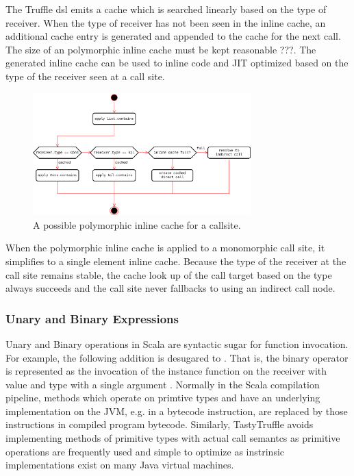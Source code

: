 The Truffle \acrshort{dsl} emits a cache which is searched linearly based on the type of receiver. 
When the type of receiver has not been seen in the inline cache, an additional cache entry is generated and appended to the cache for the next call. 
The size of an polymorphic inline cache must be kept reasonable ???. 
The generated inline cache can be used to inline code and JIT optimized based on the type of the receiver seen at a call site. 


\begin{figure}[H]
	\centering
	\includegraphics[width=0.75\textwidth]{figures/tastytruffle-pic-example.png}
	\caption{A possible polymorphic inline cache for a  callsite.}
	\label{example:poly-cache-call-node}
\end{figure}

When the polymorphic inline cache is applied to a monomorphic call site, it simplifies to a single element inline cache\cite{smalltalk:inline-caches}. 
Because the type of the receiver at the call site remains stable, the cache look up of the call target based on the type always succeeds and the call site never fallbacks to using an indirect call node.


\subsubsection{Unary and Binary Expressions}

Unary and Binary operations in Scala are syntactic sugar for function invocation. 
For example, the following addition  is desugared to . 
That is, the binary operator \scalainline{+} is represented as the invocation of the instance function  on the receiver with value  and type  with a single argument .
Normally in the Scala compilation pipeline, methods which operate on primtive types and have an underlying implementation on the JVM\cite{java:vm-spec}, e.g. in a bytecode instruction, are replaced by those instructions in compiled program bytecode. 
Similarly, TastyTruffle avoids implementing methods of primitive types with actual call semantcs as primitive operations are frequently used and simple to optimize as instrinsic implementations exist on many Java virtual machines.\cite{???}


